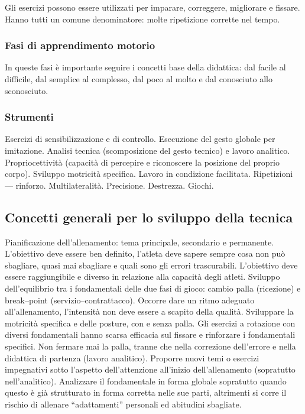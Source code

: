 Gli esercizi possono essere utilizzati per imparare, correggere, migliorare e fissare. Hanno tutti un comune denominatore: molte ripetizione corrette nel tempo.

\subsubsection{Fasi di apprendimento motorio}
In queste fasi è importante seguire i concetti base della didattica: dal facile al difficile, dal semplice al complesso, dal poco al molto e dal conosciuto allo sconosciuto.

\subsubsection{Strumenti}
Esercizi di sensibilizzazione e di controllo.
Esecuzione del gesto globale per imitazione.
Analisi tecnica (scomposizione del gesto tecnico) e lavoro analitico.
Propriocettività (capacità di percepire e riconoscere la posizione del proprio corpo).
Sviluppo motricità specifica.
Lavoro in condizione facilitata.
Ripetizioni --- rinforzo.
Multilateralità.
Precisione.
Destrezza.
Giochi.


\subsection{Concetti generali per lo sviluppo della tecnica}
Pianificazione dell'allenamento: tema principale, secondario e permanente. L'obiettivo deve essere ben definito, l'atleta deve sapere sempre cosa non può sbagliare, quasi mai sbagliare e quali sono gli errori trascurabili. L'obiettivo deve essere raggiungibile e diverso in relazione alla capacità degli atleti.
Sviluppo dell'equilibrio  tra i fondamentali delle due fasi di gioco: cambio palla (ricezione) e break--point (servizio--contrattacco).
Occorre dare un ritmo adeguato all'allenamento, l'intensità non deve essere a scapito della qualità. Sviluppare la motricità specifica e delle posture, con e senza palla.
Gli esercizi a rotazione con diversi fondamentali hanno scarsa efficacia sul fissare e rinforzare i fondamentali specifici. Non fermare mai la palla, tranne che nella correzione dell'errore e nella didattica di partenza (lavoro analitico).
Proporre nuovi temi o esercizi impegnativi sotto l'aspetto dell'attenzione all'inizio dell'allenamento (sopratutto nell'analitico).
Analizzare il fondamentale in forma globale sopratutto quando questo è già strutturato in forma corretta nelle sue parti, altrimenti si corre il rischio di allenare “adattamenti” personali
ed abitudini sbagliate.

